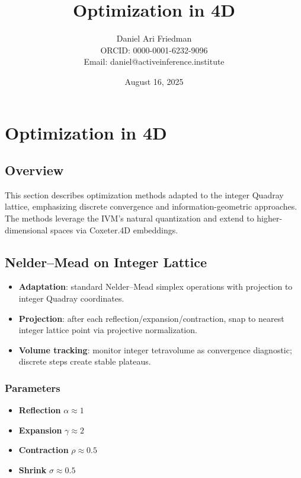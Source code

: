 \documentclass[
  10pt,
]{article}
\title{Optimization in 4D}
\author{Daniel Ari Friedman\\ ORCID: 0000-0001-6232-9096\\ Email: daniel@activeinference.institute}
\date{August 16, 2025}
\providecommand{\tightlist}{%
  \setlength{\itemsep}{0pt}\setlength{\parskip}{0pt}}
\begin{document}
\maketitle

{
\hypersetup{linkcolor=black}
\setcounter{tocdepth}{3}
\tableofcontents
}
\hypertarget{optimization-in-4d}{%
\section{Optimization in 4D}\label{optimization-in-4d}}

\hypertarget{overview}{%
\subsection{Overview}\label{overview}}

This section describes optimization methods adapted to the integer
Quadray lattice, emphasizing discrete convergence and
information-geometric approaches. The methods leverage the IVM's natural
quantization and extend to higher-dimensional spaces via Coxeter.4D
embeddings.

\hypertarget{neldermead-on-integer-lattice}{%
\subsection{Nelder--Mead on Integer
Lattice}\label{neldermead-on-integer-lattice}}

\begin{itemize}
\tightlist
\item
  \textbf{Adaptation}: standard Nelder--Mead simplex operations with
  projection to integer Quadray coordinates.
\item
  \textbf{Projection}: after each reflection/expansion/contraction, snap
  to nearest integer lattice point via projective normalization.
\item
  \textbf{Volume tracking}: monitor integer tetravolume as convergence
  diagnostic; discrete steps create stable plateaus.
\end{itemize}

\hypertarget{parameters}{%
\subsubsection{Parameters}\label{parameters}}

\begin{itemize}
\tightlist
\item
  \textbf{Reflection} \(\alpha \approx 1\)
\item
  \textbf{Expansion} \(\gamma \approx 2\)
\item
  \textbf{Contraction} \(\rho \approx 0.5\)
\item
  \textbf{Shrink} \(\sigma \approx 0.5\)
\end{itemize}
\end{document}
